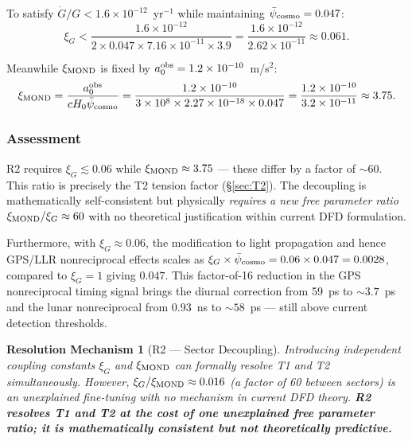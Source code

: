 \documentclass[aps,prd,twocolumn,superscriptaddress,nofootinbib,longbibliography]{revtex4-2}
\newcommand{\psibar}{\bar{\psi}}
\newcommand{\ee}[1]{\times 10^{#1}}
\newtheorem{resolution}{Resolution Mechanism}
\begin{document}
To satisfy $\dot{G}/G < 1.6\ee{-12}$~yr$^{-1}$ while maintaining
$\psibar_{\rm cosmo} = 0.047$:
\begin{equation}
\xi_G < \frac{1.6\ee{-12}}{2 \times 0.047 \times 7.16\ee{-11} \times 3.9}
= \frac{1.6\ee{-12}}{2.62\ee{-11}} \approx 0.061.
\label{eq:xi-G-bound}
\end{equation}

Meanwhile $\xi_{\rm MOND}$ is fixed by $a_0^{\rm obs} = 1.2\ee{-10}$~m/s$^2$:
\begin{equation}
\xi_{\rm MOND} = \frac{a_0^{\rm obs}}{cH_0\psibar_{\rm cosmo}}
= \frac{1.2\ee{-10}}{3\ee{8}\times 2.27\ee{-18}\times 0.047}
= \frac{1.2\ee{-10}}{3.2\ee{-11}} \approx 3.75.
\label{eq:xi-MOND-value}
\end{equation}

\subsubsection{Assessment}

R2 requires $\xi_G \lesssim 0.06$ while $\xi_{\rm MOND} \approx 3.75$ ---
these differ by a factor of $\sim 60$.  This ratio is precisely the T2
tension factor (\S\ref{sec:T2}).  The decoupling is mathematically
self-consistent but physically \emph{requires a new free parameter ratio
$\xi_{\rm MOND}/\xi_G \approx 60$} with no theoretical justification within
current DFD formulation.

Furthermore, with $\xi_G \approx 0.06$, the modification to light propagation
and hence GPS/LLR nonreciprocal effects scales as $\xi_G \times \psibar_{\rm cosmo}
= 0.06 \times 0.047 = 0.0028$, compared to $\xi_G = 1$ giving $0.047$.
This factor-of-16 reduction in the GPS nonreciprocal timing signal brings
the diurnal correction from 59~ps to $\sim\!3.7$~ps and the lunar nonreciprocal
from 0.93~ns to $\sim\!58$~ps --- still above current detection thresholds.

\begin{resolution}[R2 --- Sector Decoupling]
\label{res:R2}
Introducing independent coupling constants $\xi_G$ and $\xi_{\rm MOND}$ can
formally resolve T1 and T2 simultaneously.  However, $\xi_G/\xi_{\rm MOND}
\approx 0.016$ (a factor of 60 between sectors) is an unexplained fine-tuning
with no mechanism in current DFD theory.  \textbf{R2 resolves T1 and T2 at
the cost of one unexplained free parameter ratio; it is mathematically
consistent but not theoretically predictive.}
\end{resolution}
\end{document}
